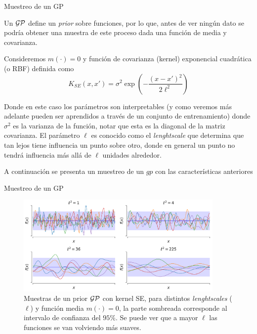 \documentclass[9pt]{beamer}
\begin{document}
\begin{frame}{Muestreo de un GP}

Un $\mathcal{GP}$ define un \textit{prior} sobre funciones, por lo que, antes de ver ningún dato se podría obtener una muestra de este proceso dada una función de media y covarianza. \pause

\vspace{0.2cm}

Consideremos $m(\cdot) = 0$ y función de covarianza (kernel) exponencial cuadrática (o RBF) definida como \pause
\begin{equation*}
  K_{SE}(x, x') = \sigma^2 \exp\left( - \frac{\left( x- x'\right)^2}{2\ell^2} \right)
\end{equation*} \pause

Donde en este caso los parámetros son interpretables (y como veremos más adelante pueden ser aprendidos a través de un conjunto de entrenamiento) donde $\sigma^2$ es la varianza de la función, notar que esta es la diagonal de la matriz covarianza. El parámetro $\ell$ es conocido como el \textit{lenghtscale} que determina que tan lejos tiene influencia un punto sobre otro, donde en general un punto no tendrá influencia más allá de $\ell$ unidades alrededor.

\vspace{0.2cm}

A continuación se presenta un muestreo de un $gp$ con las características anteriores


\end{frame}

\begin{frame}{Muestreo de un GP}

\begin{figure}[H]
  \centering
  \includegraphics[width=0.9\textwidth]{../img/cap8_prior_muestras}
  \caption{Muestras de un prior $\mathcal{GP}$ con kernel SE, para distintos \textit{lenghtscales} ($\ell$) y función media $m(\cdot)=0$, la parte sombreada corresponde al intervalo de confianza del $95\%$. Se puede ver que a mayor $\ell$ las funciones se van volviendo más suaves.}
  \label{fig:gp_1}
\end{figure}


\end{frame}
\end{document}
